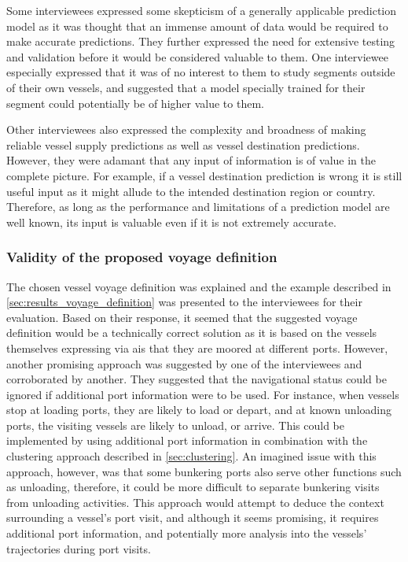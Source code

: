 Some interviewees expressed some skepticism of a generally applicable prediction model as it was thought that an immense amount of data would be required to make accurate predictions. They further expressed the need for extensive testing and validation before it would be considered valuable to them. One interviewee especially expressed that it was of no interest to them to study segments outside of their own vessels, and suggested that a model specially trained for their segment could potentially be of higher value to them.

Other interviewees also expressed the complexity and broadness of making reliable vessel supply predictions as well as vessel destination predictions. However, they were adamant that any input of information is of value in the complete picture. For example, if a vessel destination prediction is wrong it is still useful input as it might allude to the intended destination region or country. Therefore, as long as the performance and limitations of a prediction model are well known, its input is valuable even if it is not extremely accurate.

\subsubsection{Validity of the proposed voyage definition}

The chosen vessel voyage definition was explained and the example described in \cref{sec:results_voyage_definition} was presented to the interviewees for their evaluation. Based on their response, it seemed that the suggested voyage definition would be a technically correct solution as it is based on the vessels themselves expressing via \acrshort{ais} that they are moored at different ports. However, another promising approach was suggested by one of the interviewees and corroborated by another. They suggested that the navigational status could be ignored if additional port information were to be used. For instance, when vessels stop at loading ports, they are likely to load or depart, and at known unloading ports, the visiting vessels are likely to unload, or arrive. This could be implemented by using additional port information in combination with the clustering approach described in \cref{sec:clustering}. An imagined issue with this approach, however, was that some bunkering ports also serve other functions such as unloading, therefore, it could be more difficult to separate bunkering visits from unloading activities. This approach would attempt to deduce the context surrounding a vessel's port visit, and although it seems promising, it requires additional port information, and potentially more analysis into the vessels' trajectories during port visits.

